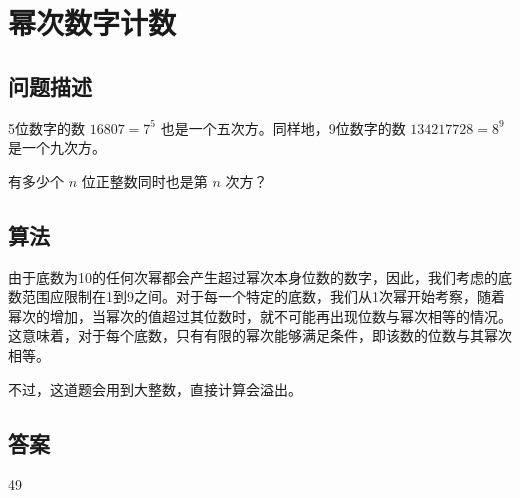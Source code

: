 \section{幂次数字计数}
\subsection{问题描述}
\begin{tcolorbox}
	5位数字的数 \( 16807 = 7^5 \) 也是一个五次方。同样地，9位数字的数 \( 134217728 = 8^9 \) 是一个九次方。

	有多少个 \( n \) 位正整数同时也是第 \( n \) 次方？
\end{tcolorbox}

\subsection{算法}
由于底数为10的任何次幂都会产生超过幂次本身位数的数字，因此，我们考虑的底数范围应限制在1到9之间。对于每一个特定的底数，我们从1次幂开始考察，随着幂次的增加，当幂次的值超过其位数时，就不可能再出现位数与幂次相等的情况。这意味着，对于每个底数，只有有限的幂次能够满足条件，即该数的位数与其幂次相等。

不过，这道题会用到大整数，直接计算会溢出。
\subsection{答案}
49
